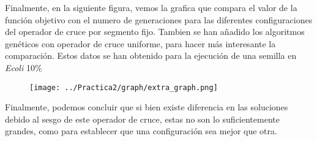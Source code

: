 \begin{table}[H]
\centering
{}
\end{table}

Finalmente, en la siguiente figura, vemos la grafica que compara el valor de la función objetivo con el numero de generaciones para las diferentes configuraciones del operador de cruce por segmento fijo. Tambien se han añadido los algoritmos genéticos con operador de cruce uniforme, para hacer más interesante la comparación. Estos datos se han obtenido para la ejecución de una semilla en \emph{Ecoli} 10\%

\begin{figure}[H]
   \centering
   \texttt{[image: ../Practica2/graph/extra\_graph.png]}
   \caption{}
\end{figure}

Finalmente, podemos concluir que si bien existe diferencia en las soluciones debido al sesgo de este operador de cruce, estas no son lo suficientemente grandes, como para establecer que una configuración sea mejor que otra.
